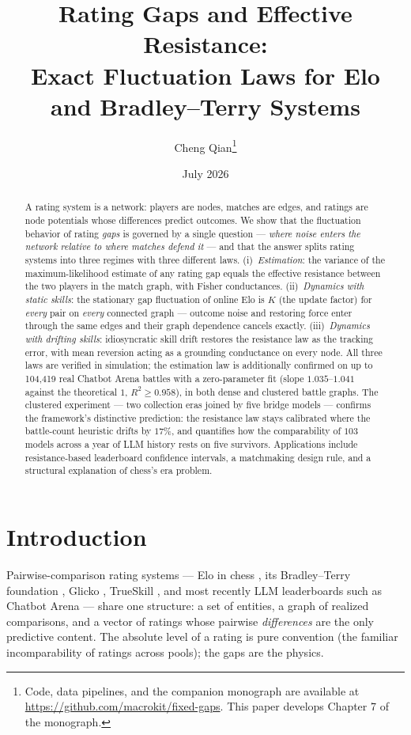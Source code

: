 \documentclass[11pt]{article}
\title{Rating Gaps and Effective Resistance:\\
Exact Fluctuation Laws for Elo and Bradley--Terry Systems}
\author{Cheng Qian\thanks{Code, data pipelines, and the
companion monograph are available at
\url{https://github.com/macrokit/fixed-gaps}. This paper develops Chapter 7
of the monograph.}}
\date{July 2026}
\begin{document}
\maketitle

\begin{abstract}
A rating system is a network: players are nodes, matches are edges, and
ratings are node potentials whose differences predict outcomes. We show
that the fluctuation behavior of rating \emph{gaps} is governed by a single
question --- \emph{where noise enters the network relative to where matches
defend it} --- and that the answer splits rating systems into three regimes
with three different laws. (i)~\emph{Estimation}: the variance of the
maximum-likelihood estimate of any rating gap equals the effective
resistance between the two players in the match graph, with Fisher
conductances. (ii)~\emph{Dynamics with static skills}: the stationary gap
fluctuation of online Elo is $K$ (the update factor) for \emph{every} pair
on \emph{every} connected graph --- outcome noise and restoring force enter
through the same edges and their graph dependence cancels exactly.
(iii)~\emph{Dynamics with drifting skills}: idiosyncratic skill drift
restores the resistance law as the tracking error, with mean reversion
acting as a grounding conductance on every node. All three laws are
verified in simulation; the estimation law is additionally confirmed on
up to 104{,}419 real Chatbot Arena battles with a zero-parameter fit
(slope $1.035$--$1.041$ against the theoretical $1$, $R^2 \ge 0.958$), in
both dense and clustered battle graphs. The clustered experiment --- two
collection eras joined by five bridge models --- confirms the framework's
distinctive prediction: the resistance law stays calibrated where the
battle-count heuristic drifts by $17\%$, and quantifies how the
comparability of $103$ models across a year of LLM history rests on five
survivors. Applications include resistance-based leaderboard confidence
intervals, a matchmaking design rule, and a structural explanation of
chess's era problem.
\end{abstract}

\section{Introduction}

Pairwise-comparison rating systems --- Elo in chess \cite{elo1978}, its
Bradley--Terry foundation \cite{zermelo1929,bradleyterry1952}, Glicko
\cite{glickman1999}, TrueSkill \cite{trueskill2006}, and most recently
LLM leaderboards such as Chatbot Arena \cite{chiang2024} --- share one
structure: a set of entities, a graph of realized comparisons, and a
vector of ratings whose pairwise \emph{differences} are the only
predictive content. The absolute level of a rating is pure convention (the
familiar incomparability of ratings across pools); the gaps are the
physics.
\end{document}
